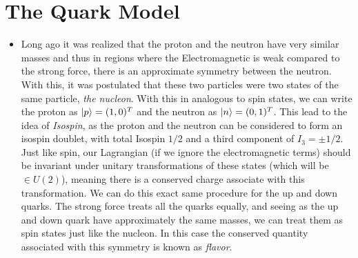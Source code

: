 \documentclass[11pt]{article}
\numberwithin{equation}{section}
\begin{document}
\section{The Quark Model}
\begin{itemize}
    \item Long ago it was realized that the proton and the neutron have very similar masses and thus in regions where the Electromagnetic is weak compared to the strong force, there is an approximate symmetry between the neutron. With this, it was postulated that these two particles were two states of the same particle, \emph{the nucleon}. With this in analogous to spin states, we can write the proton as $\ket{p} = (1,0)^T$ and the neutron as $\ket{n} = (0,1)^T$. This lead to the idea of \emph{Isospin}, as the proton and the neutron can be considered to form an isospin doublet, with total Isospin $1/2$ and a third component of $I_3 = \pm1/2$. Just like spin, our Lagrangian (if we ignore the electromagnetic terms) should be invariant under unitary transformations of these states (which will be $\in U(2)$), meaning there is a conserved charge associate with this transformation. We can do this exact same procedure for the up and down quarks. The strong force treats all the quarks equally, and seeing as the up and down quark have approximately the same masses, we can treat them as spin states just like the nucleon. In this case the conserved quantity associated with this symmetry is known as \emph{flavor}. 
\end{itemize}
\end{document}
